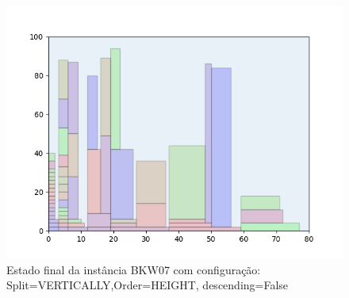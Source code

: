 \begin{figure}[H]
    \centering
    \caption[]{Estado final da instância BKW07 com configuração: Split=VERTICALLY,Order=HEIGHT, descending=False}
    \label{fig:bkw07-vertically-height-false}
    \includegraphics[scale=0.5]{output/figures/bkw/bkw07/vertically/height/false/00}
\end{figure}